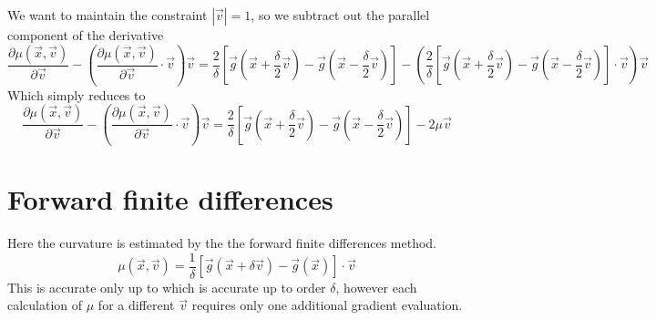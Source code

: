 \documentclass[a4paper]{article}
\begin{document}
We want to maintain the constraint $\left|\vec{v} \right| = 1$, so we subtract
out the parallel component of the derivative
\begin{equation}
\frac{\partial \mu(\vec{x}, \vec{v})} {\partial \vec{v}} - 
\left(
\frac{\partial \mu(\vec{x}, \vec{v})} {\partial \vec{v}} \cdot \vec{v}
\right) \vec{v}
= 
\frac{2}{\delta} 
\left[ \vec{g}(\vec{x} + \frac{\delta}{2} \vec{v}) 
- \vec{g}(\vec{x} - \frac{\delta}{2} \vec{v}) \right]
-
\left(
\frac{2}{\delta} 
\left[ \vec{g}(\vec{x} + \frac{\delta}{2} \vec{v}) 
-\vec{g}(\vec{x} - \frac{\delta}{2} \vec{v}) \right] \cdot \vec{v}
\right)
\vec{v}
\end{equation}
Which simply reduces to 
\begin{equation}
\frac{\partial \mu(\vec{x}, \vec{v})} {\partial \vec{v}} - 
\left(
\frac{\partial \mu(\vec{x}, \vec{v})} {\partial \vec{v}} \cdot \vec{v}
\right) \vec{v}
= 
\frac{2}{\delta} 
\left[ \vec{g}(\vec{x} + \frac{\delta}{2} \vec{v}) 
- \vec{g}(\vec{x} - \frac{\delta}{2} \vec{v}) \right]
-
2 \mu \vec{v}
\end{equation}


\section{Forward finite differences}
Here the curvature
is estimated by the the forward finite differences method.
\begin{equation}
\mu(\vec{x}, \vec{v}) = \frac{1}{\delta} 
\left[ \vec{g}(\vec{x} + \delta \vec{v}) - 
\vec{g}(\vec{x}) \right] \cdot \vec{v}
\end{equation}
This is accurate only up to which is accurate up to order $\delta$, however
each calculation of $\mu$ for a different $\vec{v}$ requires only one
additional gradient evaluation.   
\end{document}
